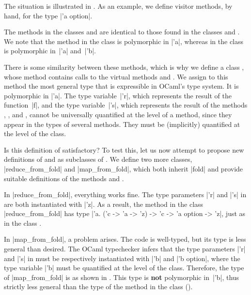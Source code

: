 \documentclass[11pt,a4paper,twoside]{article}
\renewcommand{\emph}[1]{\textbf{#1}}
\begin{document}
The situation is illustrated in . As an example, we
define visitor methods, by hand, for the type \oc|'a option|.

The methods  in the classes \reduce and \map are
identical to those found in the classes  and . We
note that the method  in the class \reduce is polymorphic
in \oc|'a|, whereas  in the class \map is polymorphic
in~\oc|'a| and~\oc|'b|.

There is some similarity between these methods, which is why we define a class
\fold, whose method  contains calls to the virtual
methods  and . We
assign to this method the most general type that is expressible in OCaml's
type system. It is polymorphic in \oc|'a|. The type variable~\oc|'r|, which
represents the result of the function~\oc|f|, and the type variable~\oc|'s|,
which represents the result of the methods ,
, and ,
cannot be universally quantified at the level of a method,
since they appear in the types of several methods.
They must be (implicitly) quantified at the level of the class.

Is this definition of \fold satisfactory? To test this, let us now attempt to
propose new definitions of \reduce and \map as subclasses of \fold. We define
two more classes, \oc|reduce_from_fold| and \oc|map_from_fold|, which both
inherit \oc|fold| and provide suitable definitions of the methods
 and .

In \oc|reduce_from_fold|, everything works fine. The type parameters \oc|'r|
and \oc|'s| in \fold are both instantiated with \oc|'z|. As a result, the
method  in the class \oc|reduce_from_fold| has type
%
\oc|'a. ('c -> 'a -> 'z) -> 'c -> 'a option -> 'z|,
%
just as in the class \reduce.

In \oc|map_from_fold|, a problem arises. The code is well-typed, but its type
is less general than desired. The OCaml typechecker infers that the type
parameters \oc|'r| and \oc|'s| in \fold must be respectively instantiated with
\oc|'b| and \oc|'b option|, where the type variable \oc|'b| must be quantified
at the level of the class. Therefore, the type of \oc|map_from_fold| is as
shown in . This type is \emph{not} polymorphic
in~\oc|'b|, thus strictly less general than the type of the method
 in the class \map ().
\end{document}
